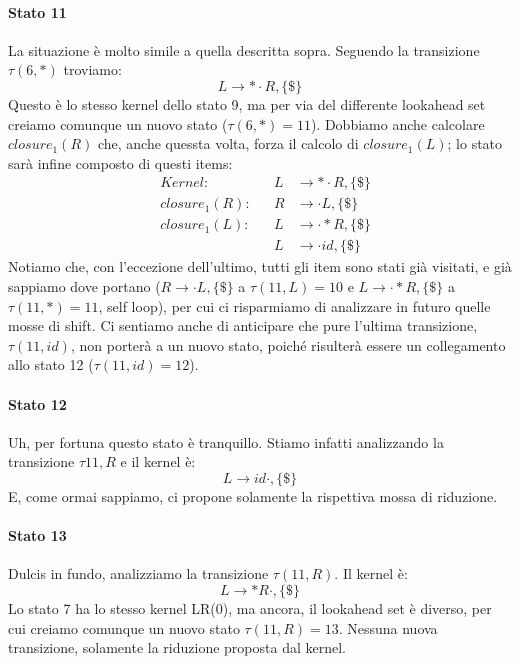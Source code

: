 \documentclass[class=book, crop=false, oneside, 12pt]{standalone}
\begin{document}
\paragraph{Stato 11}
La situazione è molto simile a quella descritta sopra. Seguendo la transizione \(\tau(6, \ast)\) troviamo:
\begin{equation*}
    L \to \ast \cdot R, \{\$\}
\end{equation*}
Questo è lo stesso kernel dello stato 9, ma per via del differente lookahead set creiamo comunque un nuovo stato (\(\tau(6, \ast) = 11\)). Dobbiamo anche calcolare \(closure_1(R)\) che, anche quessta volta, forza il calcolo di \(closure_1(L)\); lo stato sarà infine composto di questi items:
\begin{align*}
    &&Kernel: &&L &\to \ast \cdot R, \{\$\}& \\
    &&closure_1(R): &&R &\to \cdot L, \{\$\} &\\
    &&closure_1(L): &&L &\to \cdot \ast R, \{\$\}&\\
    && &&L &\to \cdot id,  \{\$\}&
\end{align*}
Notiamo che, con l'eccezione dell'ultimo, tutti gli item sono stati già visitati, e già sappiamo dove portano (\(R \to \cdot L, \{\$\}\) a \(\tau(11, L) = 10\) e \(L \to \cdot \ast R, \{\$\}\) a \(\tau(11, \ast) = 11\), self loop), per cui ci risparmiamo di analizzare in futuro quelle mosse di shift. Ci sentiamo anche di anticipare che pure l'ultima transizione, \(\tau(11, id)\), non porterà a un nuovo stato, poiché risulterà essere un collegamento allo stato 12 (\(\tau(11, id) = 12\)).

\paragraph{Stato 12}
Uh, per fortuna questo stato è tranquillo. Stiamo infatti analizzando la transizione \(\tau 11, R\) e il kernel è:
\begin{equation*}
    L \to id \cdot, \{\$\}
\end{equation*}
E, come ormai sappiamo, ci propone solamente la rispettiva mossa di riduzione.

\paragraph{Stato 13}
Dulcis in fundo, analizziamo la transizione \(\tau(11, R)\). Il kernel è:
\begin{equation*}
    L \to \ast R \cdot , \{\$\}
\end{equation*}
Lo stato 7 ha lo stesso kernel LR(0), ma ancora, il lookahead set è diverso, per cui creiamo comunque un nuovo stato \(\tau(11, R) = 13\). Nessuna nuova transizione, solamente la riduzione proposta dal kernel.
\end{document}
